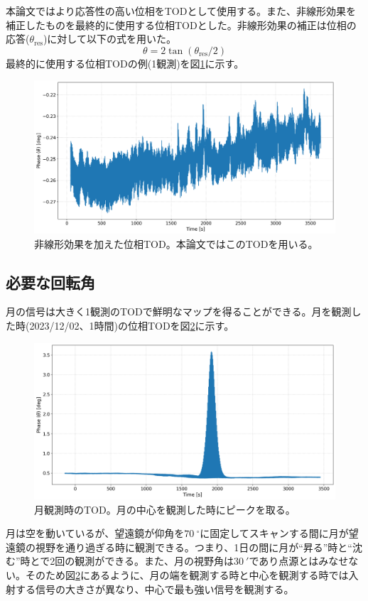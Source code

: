 本論文ではより応答性の高い位相をTODとして使用する。また、非線形効果を補正したものを最終的に使用する位相TODとした。非線形効果の補正は位相の応答($\theta_{\mathrm{res}}$)に対して以下の式\cite{sueno_doctor}を用いた。
\begin{equation}
  \theta = 2\tan(\theta_{\mathrm{res}}/2)
\end{equation}
最終的に使用する位相TODの例(1観測)を図\ref{raw_phase}に示す。
\begin{figure}[htbp]
  \centering
  \includegraphics[width=0.9\columnwidth]{5_alignment/figs/raw_phase_deg.png}
  \caption{非線形効果を加えた位相TOD。本論文ではこのTODを用いる。}
  \label{raw_phase}
\end{figure}

\subsection{必要な回転角}
\label{angle_calculation}
月の信号は大きく1観測のTODで鮮明なマップを得ることができる。月を観測した時(2023/12/02、1時間)の位相TODを図\ref{6550_kid0_phase}に示す。
\begin{figure}[htbp]
  \centering
  \includegraphics[width=0.85\columnwidth]{5_alignment/figs/6550_kid0_phase.png}
  \caption{月観測時のTOD。月の中心を観測した時にピークを取る。}
  \label{6550_kid0_phase}
\end{figure}
月は空を動いているが、望遠鏡が仰角を$\SI{70}{^{\circ}}$に固定してスキャンする間に月が望遠鏡の視野を通り過ぎる時に観測できる。つまり、1日の間に月が``昇る''時と``沈む''時とで2回の観測ができる。また、月の視野角は$\SI{30}{'}$であり点源とはみなせない。そのため図\ref{6550_kid0_phase}にあるように、月の端を観測する時と中心を観測する時では入射する信号の大きさが異なり、中心で最も強い信号を観測する。


